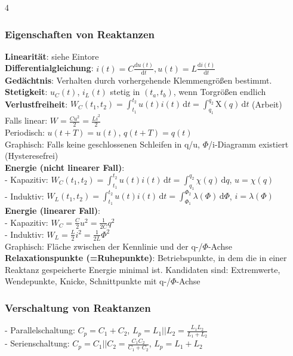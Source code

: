 \documentclass[fs, footer]{latex4ei}
\begin{document}
\begin{multicols*}{4}
    \subsubsection{Eigenschaften von Reaktanzen}
    \textbf{Linearität}: siehe Eintore\\
    \textbf{Differentialgleichung}: $i(t) = C \frac{\mathrm du(t)}{\mathrm dt}, u(t) = L \frac{\mathrm di(t)}{\mathrm dt}$\\
    \textbf{Gedächtnis}: Verhalten durch vorhergehende Klemmengrößen bestimmt.\\
    \textbf{Stetigkeit}: $u_C(t)$, $i_L(t)$ stetig in $(t_a, t_b)$, wenn Torgrößen endlich\\
    \textbf{Verlustfreiheit}: $W_C(t_1, t_2) = \int_{t_1}^{t_2}\! u(t)i(t)\,\mathrm dt = \int_{q_1}^{q_2}\! \mathrm{X}(q)\,\mathrm{d}t$ (Arbeit)\\
    Falls linear: $W = \frac{Cu^2}{2} = \frac{Li^2}{2}$\\
    Periodisch: $u(t+T) = u(t)$, $q(t+T) = q(t)$\\
    Graphisch: Falls keine geschlossenen Schleifen in q/u, $\Phi$/i-Diagramm existiert (Hysteresefrei)\\
    \textbf{Energie (nicht linearer Fall)}:\\
    - Kapazitiv: $W_C(t_1, t_2) = \int_{t_1}^{t_2} \! u(t)i(t)\, \mathrm dt = \int_{q_1}^{q_2} \! \chi(q)\, \mathrm dq$, $u=\chi(q)$\\
    - Induktiv: $W_L(t_1, t_2) = \int_{t_1}^{t_2} \! u(t)i(t)\, \mathrm dt = \int_{\Phi_1}^{\Phi_2} \! \lambda(\Phi)\, \mathrm d\Phi$, $i=\lambda(\Phi)$\\
    \textbf{Energie (linearer Fall)}:\\
    - Kapazitiv: $W_C = \frac{C}{2}u^2 = \frac{1}{2C}q^2$\\
    - Induktiv: $W_L = \frac{L}{2}i^2 = \frac{1}{2L} \Phi^2$\\
    Graphisch: Fläche zwischen der Kennlinie und der q-/$\Phi$-Achse\\
    \textbf{Relaxationspunkte (=Ruhepunkte)}: Betriebspunkte, in dem die in einer Reaktanz gespeicherte Energie minimal ist. Kandidaten sind: Extremwerte, Wendepunkte, Knicke, Schnittpunkte mit q-/$\Phi$-Achse\\
    \subsubsection{Verschaltung von Reaktanzen}
    - Parallelschaltung: $C_p = C_1 + C_2$, $L_p = L_1 || L_2 = \frac{L_1L_2}{L_1+L_2}$\\
    - Serienschaltung: $C_p = C_1 || C_2 = \frac{C_1C_2}{C_1+C_2}$, $L_p = L_1 + L_2$\\



\end{multicols*}
\end{document}
